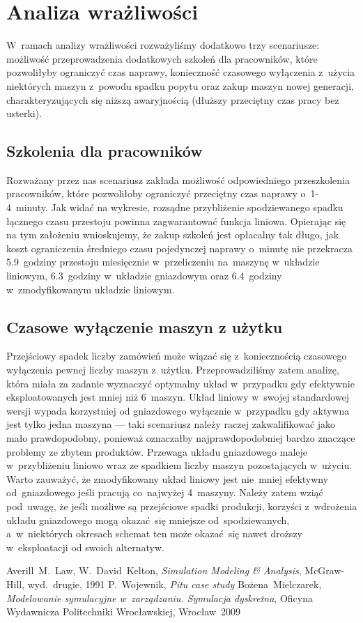 \documentclass[12pt, a4paper, oneside]{mwart} %
\begin{document}
\section{Analiza wrażliwości}
W~ramach analizy wrażliwości rozważyliśmy dodatkowo trzy scenariusze: możliwość przeprowadzenia dodatkowych szkoleń dla pracowników, które pozwoliłyby ograniczyć czas naprawy, konieczność czasowego wyłączenia z~użycia niektórych maszyn z~powodu spadku popytu oraz zakup maszyn nowej generacji, charakteryzujących się niższą awaryjnością (dłuższy przeciętny czas pracy bez usterki).

\subsection{Szkolenia dla pracowników}
Rozważany przez nas scenariusz zakłada możliwość odpowiedniego przeszkolenia pracowników, które pozwoliłoby ograniczyć przeciętny czas naprawy o~1-4~minuty. Jak widać na wykresie, rozsądne przybliżenie spodziewanego spadku łącznego czasu przestoju powinna zagwarantować funkcja liniowa. Opierając się na tym założeniu wnioskujemy, że zakup szkoleń jest opłacalny tak długo, jak koszt ograniczenia średniego czasu pojedynczej naprawy o~minutę nie przekracza 5.9~godziny przestoju miesięcznie w~przeliczeniu na~maszynę w~układzie liniowym, 6.3~godziny w~układzie gniazdowym oraz 6.4~godziny w~zmodyfikowanym układzie liniowym.

\subsection{Czasowe wyłączenie maszyn z użytku}
Przejściowy spadek liczby zamówień może wiązać się z~koniecznością czasowego wyłączenia pewnej liczby maszyn z~użytku. Przeprowadziliśmy zatem analizę, która miała za zadanie wyznaczyć optymalny układ w~przypadku gdy efektywnie eksploatowanych jest mniej niż 6~maszyn. Układ liniowy w~swojej standardowej wersji wypada korzystniej od gniazdowego wyłącznie w~przypadku gdy aktywna jest tylko jedna maszyna --- taki scenariusz należy raczej zakwalifikować jako mało prawdopodobny, ponieważ oznaczałby najprawdopodobniej bardzo znaczące problemy ze zbytem produktów. Przewaga układu gniazdowego maleje w~przybliżeniu liniowo wraz ze spadkiem liczby maszyn pozostających w~użyciu. Warto zauważyć, że zmodyfikowany układ liniowy jest nie~mniej efektywny od~gniazdowego jeśli pracują co~najwyżej 4~maszyny. Należy zatem wziąć pod~uwagę, że jeśli możliwe są przejściowe spadki produkcji, korzyści z~wdrożenia układu gniazdowego mogą okazać~się mniejsze od~spodziewanych, a~w~niektórych okresach schemat ten może okazać~się nawet droższy w~eksploatacji od swoich alternatyw.


\begin{thebibliography}{9}
Averill~M.~Law, W.~David~Kelton,
\emph{Simulation Modeling \& Analysis},
McGraw-Hill, wyd.~drugie, 1991
P.~Wojewnik, \emph{Pitu case study}
Bożena~Mielczarek, \emph{Modelowanie symulacyjne w~zarządzaniu. Symulacja dyskretna},
Oficyna Wydawnicza Politechniki Wrocławskiej, Wrocław~2009
\end{thebibliography}
\end{document}
